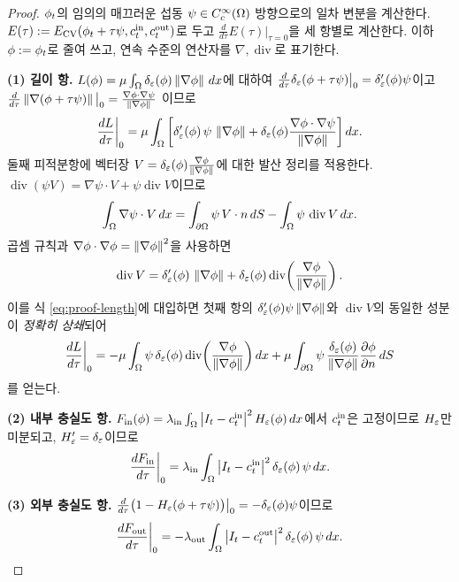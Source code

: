 \begin{proof}
$\phi_t$의 임의의 매끄러운 섭동 $\psi \in C^\infty_c(\Omega)$ 방향으로의 일차 변분을
계산한다. $E(\tau) := E_{\mathrm{CV}}(\phi_t + \tau\psi, c^{\mathrm{in}}_t, c^{\mathrm{out}}_t)$로 두고
$\frac{d}{d\tau}E(\tau)\big|_{\tau=0}$을 세 항별로 계산한다. 이하 $\phi := \phi_t$로
줄여 쓰고, 연속 수준의 연산자를 $\nabla,\operatorname{div}$로 표기한다.

\textbf{(1) 길이 항.} $L(\phi) = \mu\int_\Omega \delta_\varepsilon(\phi)\left\lVert \nabla\phi \right\rVert\,dx$에 대하여
$\frac{d}{d\tau}\delta_\varepsilon(\phi+\tau\psi)\big|_0 = \delta_\varepsilon'(\phi)\psi$이고
$\frac{d}{d\tau}\left\lVert \nabla(\phi+\tau\psi) \right\rVert\big|_0 = \frac{\nabla\phi\cdot\nabla\psi}{\left\lVert \nabla\phi \right\rVert}$
이므로
\begin{equation}
  \frac{dL}{d\tau}\bigg|_0
  = \mu \int_\Omega \left[
    \delta_\varepsilon'(\phi)\,\psi\,\left\lVert \nabla\phi \right\rVert
    + \delta_\varepsilon(\phi)\frac{\nabla\phi\cdot\nabla\psi}{\left\lVert \nabla\phi \right\rVert}
  \right] dx.
  \label{eq:proof-length}
\end{equation}
둘째 피적분항에 벡터장 $V = \delta_\varepsilon(\phi)\frac{\nabla\phi}{\left\lVert \nabla\phi \right\rVert}$에 대한
발산 정리를 적용한다. $\operatorname{div}(\psi V) = \nabla\psi\cdot V + \psi\operatorname{div}V$이므로
\[
  \int_\Omega \nabla\psi \cdot V\,dx
  = \int_{\partial\Omega} \psi\,V\cdot n\,dS - \int_\Omega \psi\,\operatorname{div}V\,dx.
\]
곱셈 규칙과 $\nabla\phi\cdot\nabla\phi = \left\lVert \nabla\phi \right\rVert^2$을 사용하면
\[
  \operatorname{div}V
  = \delta_\varepsilon'(\phi)\,\left\lVert \nabla\phi \right\rVert
  + \delta_\varepsilon(\phi)\operatorname{div}\!\left(\frac{\nabla\phi}{\left\lVert \nabla\phi \right\rVert}\right).
\]
이를 식 \eqref{eq:proof-length}에 대입하면 첫째 항의
$\delta_\varepsilon'(\phi)\psi\left\lVert \nabla\phi \right\rVert$와 $\operatorname{div}V$의 동일한 성분이 \emph{정확히
상쇄}되어
\begin{equation}
  \frac{dL}{d\tau}\bigg|_0
  = -\mu\int_\Omega \psi\,\delta_\varepsilon(\phi)\operatorname{div}\!\left(\frac{\nabla\phi}{\left\lVert \nabla\phi \right\rVert}\right) dx
  + \mu\int_{\partial\Omega} \psi\,\frac{\delta_\varepsilon(\phi)}{\left\lVert \nabla\phi \right\rVert}
    \frac{\partial\phi}{\partial n}\,dS
  \label{eq:proof-length-final}
\end{equation}
를 얻는다.

\textbf{(2) 내부 충실도 항.}
$F_{\mathrm{in}}(\phi) = \lambda_{\mathrm{in}}\int_\Omega \left\lvert I_t-c^{\mathrm{in}}_t \right\rvert^2 H_\varepsilon(\phi)\,dx$에서 $c^{\mathrm{in}}_t$은
고정이므로 $H_\varepsilon$만 미분되고, $H_\varepsilon' = \delta_\varepsilon$이므로
\begin{equation}
  \frac{dF_{\mathrm{in}}}{d\tau}\bigg|_0
  = \lambda_{\mathrm{in}} \int_\Omega \left\lvert I_t-c^{\mathrm{in}}_t \right\rvert^2 \delta_\varepsilon(\phi)\,\psi\,dx.
\end{equation}

\textbf{(3) 외부 충실도 항.}
$\frac{d}{d\tau}\bigl(1-H_\varepsilon(\phi+\tau\psi)\bigr)\big|_0 = -\delta_\varepsilon(\phi)\psi$이므로
\begin{equation}
  \frac{dF_{\mathrm{out}}}{d\tau}\bigg|_0
  = -\lambda_{\mathrm{out}} \int_\Omega \left\lvert I_t-c^{\mathrm{out}}_t \right\rvert^2 \delta_\varepsilon(\phi)\,\psi\,dx.
\end{equation}


\end{proof}
